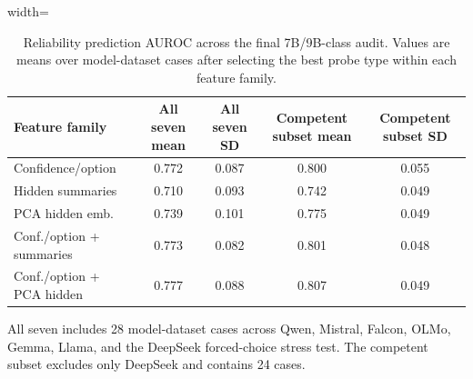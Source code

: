 \begin{table}[t]
\centering
\small
\caption{Reliability prediction AUROC across the final 7B/9B-class audit. Values are means over model-dataset cases after selecting the best probe type within each feature family.}
\label{tab:overall-probes}
\begin{threeparttable}
\begin{adjustbox}{width=\textwidth}
\begin{tabular}{lcccc}
\toprule
Feature family & All seven mean & All seven SD & Competent subset mean & Competent subset SD \\
\midrule
Confidence/option & 0.772 & 0.087 & 0.800 & 0.055 \\
Hidden summaries & 0.710 & 0.093 & 0.742 & 0.049 \\
PCA hidden emb. & 0.739 & 0.101 & 0.775 & 0.049 \\
Conf./option + summaries & 0.773 & 0.082 & 0.801 & 0.048 \\
Conf./option + PCA hidden & 0.777 & 0.088 & 0.807 & 0.049 \\
\bottomrule
\end{tabular}
\end{adjustbox}

\begin{tablenotes}[flushleft]\footnotesize\item \parbox{0.95\textwidth}{All seven includes 28 model-dataset cases across Qwen, Mistral, Falcon, OLMo, Gemma, Llama, and the DeepSeek forced-choice stress test. The competent subset excludes only DeepSeek and contains 24 cases.}\end{tablenotes}
\end{threeparttable}
\end{table}
